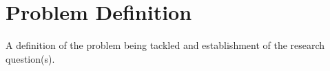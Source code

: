 \documentclass[../../fyp.tex]{subfiles}
\begin{document}
\section{Problem Definition}
A definition of the problem being tackled and establishment of the research question(s).
\end{document}
